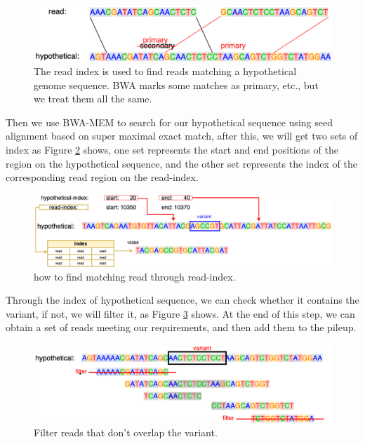 \begin{figure}[H]
\includegraphics[width=1\columnwidth]{body/image/3-6.png}
\caption[primary alignment]{The read index is used to find reads matching a hypothetical genome sequence.  BWA marks some matches as primary, etc., but we treat them all the same.}
\label{f3-6}
\end{figure}

Then we use BWA-MEM to search for our hypothetical sequence using seed alignment based on super maximal exact match, after this, we will get two sets of index as Figure \ref{f3-7} shows, one set represents the start and end positions of the region on the hypothetical sequence, and the other set represents the index of the corresponding read region on the read-index. 

\begin{figure}[H]
\vspace{1em}
\includegraphics[width=1\columnwidth]{body/image/3-7.png}
\caption[read-index]{how to find matching read through read-index.}
\label{f3-7}
\end{figure}

Through the index of hypothetical sequence, we can check whether it contains the variant, if not, we will filter it, as Figure \ref{f3-8} shows.  At the end of this step, we can obtain a set of reads meeting our requirements, and then add them to the pileup.

\begin{figure}[H]
\includegraphics[width=1\columnwidth]{body/image/3-8.png}
\caption[Filter reads]{Filter reads that don't overlap the variant.}
\label{f3-8}
\end{figure}


